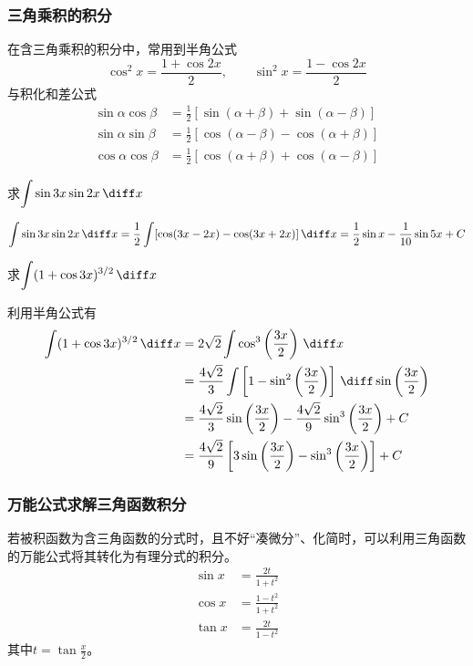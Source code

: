 \subsubsection{三角乘积的积分}
在含三角乘积的积分中，常用到半角公式
\[ \cos^2x = \frac{1+\cos 2x}{2}, \qquad \sin^2x = \frac{1-\cos 2x}{2} \]
与积化和差公式
\begin{align*}
    \sin\alpha\cos\beta & = \frac{1}{2}[\sin(\alpha+\beta)+\sin(\alpha-\beta)] \\
    \sin\alpha\sin\beta & = \frac{1}{2}[\cos(\alpha-\beta)-\cos(\alpha+\beta)] \\
    \cos\alpha\cos\beta & = \frac{1}{2}[\cos(\alpha+\beta)+\cos(\alpha-\beta)]
\end{align*}

\begin{example}
    求$\displaystyle \int\sin 3x\sin 2x\,\diff x$
\end{example}
\begin{solution}
    \[
        \int\sin 3x\sin 2x\,\diff x
        =
        \frac{1}{2}\int [\cos(3x-2x) - \cos(3x+2x)] \,\diff x
        =
        \frac{1}{2}\sin x - \frac{1}{10}\sin 5x + C
    \]
\end{solution}
\begin{example}
    求$\displaystyle \int(1+\cos 3x)^{3/2}\,\diff x$
\end{example}
\begin{solution}
    利用半角公式有
    \begin{align*}
        \int(1+\cos 3x)^{3/2}\,\diff x & = 2\sqrt{2}\int \cos^3\left(\frac{3x}{2}\right)\,\diff x                                                      \\
                                       & = \frac{4\sqrt{2}}{3}\int \left[1-\sin^2\left(\frac{3x}{2}\right)\right]\,\diff \sin\left(\frac{3x}{2}\right) \\
                                       & = \frac{4\sqrt{2}}{3}\sin\left(\frac{3x}{2}\right) - \frac{4\sqrt{2}}{9}\sin^3\left(\frac{3x}{2}\right) + C   \\
                                       & = \frac{4\sqrt{2}}{9}\left[3\sin\left(\frac{3x}{2}\right)-\sin^3\left(\frac{3x}{2}\right)\right] + C
    \end{align*}
\end{solution}

\subsubsection{万能公式求解三角函数积分}
若被积函数为含三角函数的分式时，且不好“凑微分”、化简时，可以利用三角函数的万能公式将其转化为有理分式的积分。
\begin{align}
    \label{eq:万能公式}
    \sin x & = \frac{2t}{1+t^2}    \\
    \cos x & = \frac{1-t^2}{1+t^2} \\
    \tan x & = \frac{2t}{1-t^2}
\end{align}
其中$t=\tan \frac{x}{2}$。

